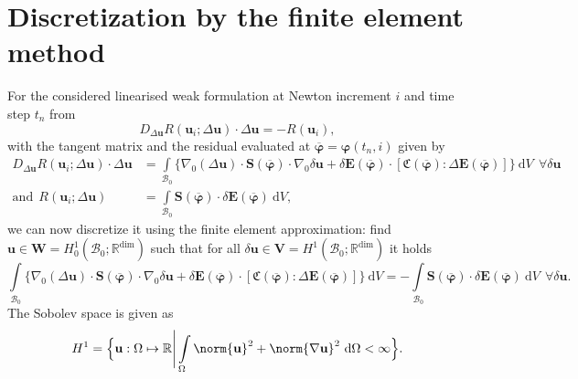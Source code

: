 \section{Discretization by the finite element method}
For the considered linearised weak formulation at Newton increment $i$ and time step $t_n$ from 
\begin{equation}
D_{\Delta \mathbf{u}} R(\mathbf{u}_i; \Delta \mathbf{u}) \cdot \Delta\mathbf{u} = -R(\mathbf{u}_{i}) ,
\label{eq:2.24}
\end{equation}
with the tangent matrix and the residual evaluated at $\overline{\bm{\varphi}} = \bm{\varphi}(t_n,i)$ given by
\begin{align*}
D_{\Delta\mathbf{u}} R(\mathbf{u}_i; \Delta \mathbf{u}) \cdot \Delta\mathbf{u} &= \int\limits_{\mathcal{B}_0} \Big\lbrace \nabla_0 (\Delta\mathbf{u}) \cdot \mathbf{S}(\overline{\bm{\varphi}}) \cdot \nabla_0 \delta\mathbf{u} + \delta \mathbf{E}(\overline{\bm{\varphi}}) \cdot \left[ \mathfrak{C}(\overline{\bm{\varphi}}) : \Delta\mathbf{E}(\overline{\bm{\varphi}}) \right] \Big\rbrace \ \mathrm{d}V \ \ \forall \delta\mathbf{u} \\
\text{and} \ \ R(\mathbf{u}_i; \Delta \mathbf{u}) &= \int\limits_{\mathcal{B}_0} \mathbf{S}(\overline{\bm{\varphi}}) \cdot \delta \mathbf{E}(\overline{\bm{\varphi}}) \ \mathrm{d}V,
\end{align*}
we can now discretize it using the finite element approximation: find $\mathbf{u} \in \mathbf{W} = H^1_0 (\mathcal{B}_0; \mathbb{R}^{\text{dim}})$ such that for all $\delta\mathbf{u} \in \mathbf{V} = H^1 (\mathcal{B}_0; \mathbb{R}^{\text{dim}})$ it holds
\begin{equation}
\int\limits_{\mathcal{B}_0} \Big\lbrace \nabla_0 (\Delta\mathbf{u}) \cdot \mathbf{S}(\overline{\bm{\varphi}}) \cdot \nabla_0 \delta\mathbf{u} + \delta \mathbf{E}(\overline{\bm{\varphi}}) \cdot \left[ \mathfrak{C}(\overline{\bm{\varphi}}) : \Delta\mathbf{E}(\overline{\bm{\varphi}}) \right] \Big\rbrace \ \mathrm{d}V = -\int\limits_{\mathcal{B}_0} \mathbf{S}(\overline{\bm{\varphi}}) \cdot \delta \mathbf{E}(\overline{\bm{\varphi}}) \ \mathrm{d}V \ \ \forall \delta\mathbf{u}.
\label{eq:2.23}
\end{equation}
The Sobolev space is given as 
\begin{equation}
H^1 = \Big\lbrace \mathbf{u}: \Omega \mapsto \mathbb{R} \Bigg| \int\limits_{\Omega} \norm{\mathbf{u}}^2 + \norm{\nabla \mathbf{u}}^2 \ \mathrm{d}\Omega < \infty \Big\rbrace.
\end{equation}
